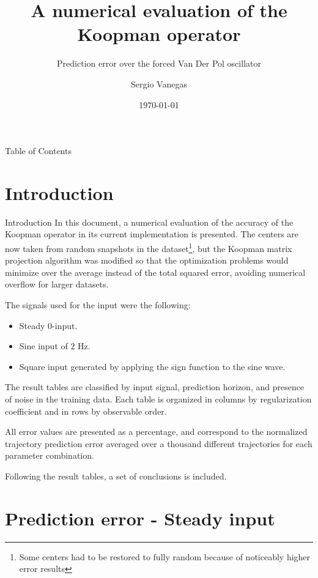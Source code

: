 \documentclass{beamer}
\title[Process]{A numerical evaluation of the Koopman operator}
\subtitle{Prediction error over the forced Van Der Pol oscillator}
\institute[Polimi]{Politecnico di Milano}
\author{Sergio Vanegas}
\date{\today}
\begin{document}
\begin{frame}
    \maketitle
\end{frame}

\begin{frame}{Table of Contents}
    \tableofcontents
\end{frame}


\section{Introduction}

\begin{frame}{Introduction}
    \footnotesize
    In this document, a numerical evaluation of the accuracy of the Koopman operator in its current implementation is presented. The centers are now taken from random snapshots in the dataset\footnote{Some centers had to be restored to fully random because of noticeably higher error results}, but the Koopman matrix projection algorithm was modified so that the optimization problems would minimize over the average instead of the total squared error, avoiding numerical overflow for larger datasets.

    The signals used for the input were the following:

    \begin{itemize}
        \item Steady 0-input.
        \item Sine input of $2$ Hz.
        \item Square input generated by  applying the sign function to the sine wave.
    \end{itemize}
    
    The result tables are classified by input signal, prediction horizon, and presence of noise in the training data. Each table is organized in columns by regularization coefficient and in rows by observable order. 
    
    All error values are presented as a percentage, and correspond to the normalized trajectory prediction error averaged over a thousand different trajectories for each parameter combination.

    Following the result tables, a set of conclusions is included.
\end{frame}


\section{Prediction error - Steady input}
\end{document}
